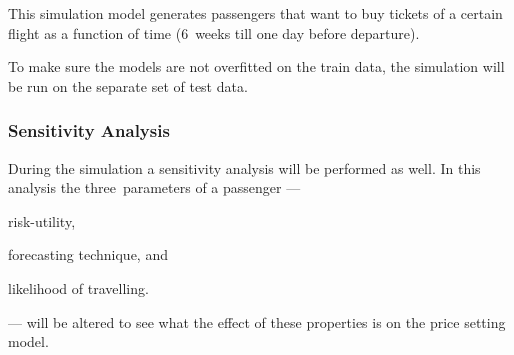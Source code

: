 This simulation model generates passengers that want to buy tickets of a certain flight as a function of time (6~weeks till one day before departure). 

To make sure the models are not overfitted on the train data, the simulation will be run on the separate set of test data.

\subsubsection{Sensitivity Analysis}
During the simulation a sensitivity analysis will be performed as well. In this analysis the three~parameters of a passenger --- \begin{inparaenum}
\item risk-utility,
\item forecasting technique, and
\item likelihood of travelling.
\end{inparaenum} --- will be altered to see what the effect of these properties is on the price setting model.


